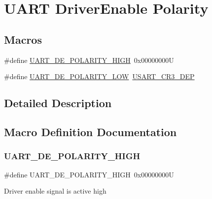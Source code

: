 \hypertarget{group___u_a_r_t___driver_enable___polarity}{}\section{U\+A\+RT Driver\+Enable Polarity}
\label{group___u_a_r_t___driver_enable___polarity}
\subsection*{Macros}
\begin{DoxyCompactItemize}
\item 
\#define \mbox{\hyperlink{group___u_a_r_t___driver_enable___polarity_ga0cff167e046507f91497853b772282c5}{U\+A\+R\+T\+\_\+\+D\+E\+\_\+\+P\+O\+L\+A\+R\+I\+T\+Y\+\_\+\+H\+I\+GH}}~0x00000000U
\item 
\#define \mbox{\hyperlink{group___u_a_r_t___driver_enable___polarity_ga92a5839b1b14f95ee4b8f4842a24f37b}{U\+A\+R\+T\+\_\+\+D\+E\+\_\+\+P\+O\+L\+A\+R\+I\+T\+Y\+\_\+\+L\+OW}}~\mbox{\hyperlink{group___peripheral___registers___bits___definition_ga2000c42015289291da1c58fe27800d64}{U\+S\+A\+R\+T\+\_\+\+C\+R3\+\_\+\+D\+EP}}
\end{DoxyCompactItemize}


\subsection{Detailed Description}


\subsection{Macro Definition Documentation}
\mbox{\label{group___u_a_r_t___driver_enable___polarity_ga0cff167e046507f91497853b772282c5}} 
\subsubsection{\texorpdfstring{UART\_DE\_POLARITY\_HIGH}{UART\_DE\_POLARITY\_HIGH}}
{\footnotesize\ttfamily \#define U\+A\+R\+T\+\_\+\+D\+E\+\_\+\+P\+O\+L\+A\+R\+I\+T\+Y\+\_\+\+H\+I\+GH~0x00000000U}

Driver enable signal is active high \mbox{\label{group___u_a_r_t___driver_enable___polarity_ga92a5839b1b14f95ee4b8f4842a24f37b}} 
